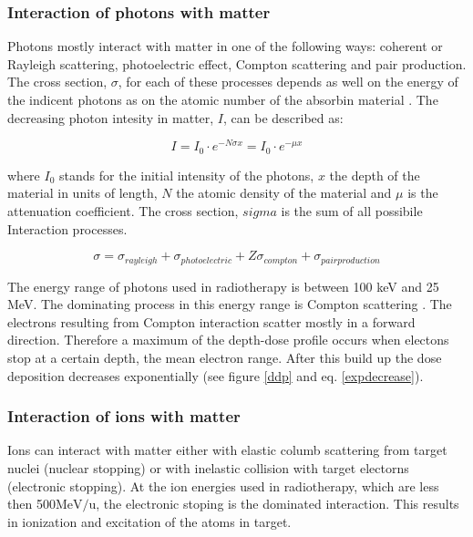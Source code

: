 \documentclass[type=dr, dr=rernat, accentcolor=tud7b,colorbacktitle, bigchapter, openright, twoside, 12pt ]{tudthesis}
\begin{document}
\subsubsection{Interaction of photons with matter}

Photons mostly interact with matter in one of the following ways: coherent or Rayleigh scattering, photoelectric effect, Compton scattering and pair production. The cross section, $\sigma$, for each of these processes depends
as well on the energy of the indicent photons as on the atomic number of the absorbin material \cite{Lilley2006}. The decreasing photon intesity in matter, $I$, can be described as:


\begin{equation}
 I = I_{0} \cdot e^{- N \sigma x} = I_{0} \cdot e^{-\mu x}
 \label{expdecrease}
\end{equation} 

where $I_{0}$ stands for the initial intensity of the photons, $x$ the depth of the material in units of length, $N$ the atomic density of the material and $\mu$ is the attenuation coefficient. The cross section, $sigma$ is the sum of all
possibile Interaction processes.

\begin{equation}
{\sigma} = \sigma_{rayleigh} + \sigma_{photoelectric} + Z\sigma_{compton} + \sigma_{pairproduction} 
\end{equation}

The energy range of photons used in radiotherapy is between 100 keV and 25 MeV. The dominating process in this energy range is Compton scattering \cite{Alpen1998}.
The electrons resulting from Compton interaction scatter mostly in a forward direction. Therefore a maximum of the depth-dose profile occurs when electons stop at a certain depth, 
the mean electron range. After this build up the dose deposition decreases exponentially (see figure \ref{ddp} and eq. \ref{expdecrease}).


\subsubsection{Interaction of ions with matter}
\label{iion}
Ions can interact with matter either with elastic columb scattering from target nuclei (nuclear stopping) or with inelastic collision with target electorns (electronic stopping).
At the ion energies used in radiotherapy, which are less then 500$\mathrm{MeV}/\mathrm{u}$, the electronic stoping is the dominated interaction. This results in ionization and excitation of the atoms in target.
\end{document}
